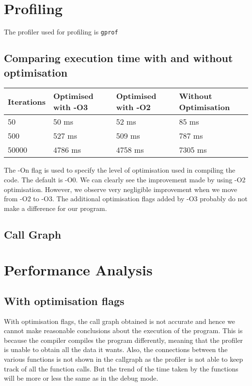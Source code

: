 \documentclass[11pt]{article}
\begin{document}
\section{Profiling}

	The profiler used for profiling is \texttt{gprof}

\subsection{Comparing execution time with and without optimisation}

	\vspace{0.5cm}

	\begin{center}
		\begin{tabular}{ | l | l | l | l |}
			\hline
				Iterations & Optimised with -O3 & Optimised with -O2 & Without Optimisation \\ \hline
				50 & 50 ms & 52 ms & 85 ms \\ \hline
				500 & 527 ms & 509 ms & 787 ms\\ \hline
				50000 & 4786 ms & 4758 ms & 7305 ms\\ \hline
		\end{tabular}
	\end{center}

	The -On flag is used to specify the level of optimisation used in compiling the code. The default is -O0. We can clearly see the improvement made by using -O2 optimisation. However, we observe very negligible improvement when we move from -O2 to -O3. The additional optimisation flags added by -O3 probably do not make a difference for our program.

\subsection{Call Graph}

	\vspace{0.5cm}


\section{Performance Analysis}

	\subsection{With optimisation flags}
	With optimisation flags, the call graph obtained is not accurate and hence we cannot make reasonable conclusions about the execution of the program. This is because the compiler compiles the program differently, meaning that the profiler is unable to obtain all the data it wants. Also, the connections between the various functions is not shown in the callgraph as the profiler is not able to keep track of all the function calls. But the trend of the time taken by the functions will be more or less the same as in the debug mode.
\end{document}
